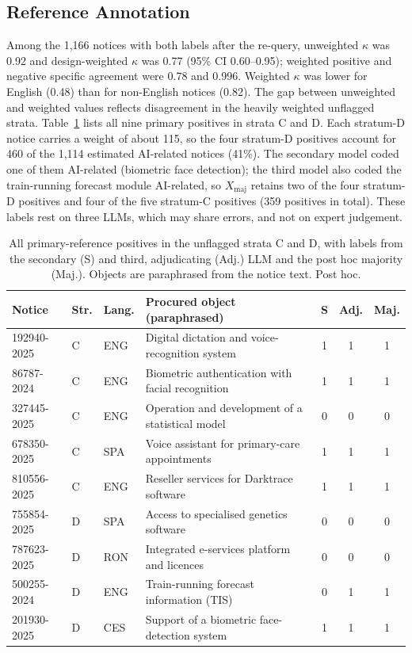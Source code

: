 \documentclass[runningheads]{llncs}
\begin{document}
\subsection{Reference Annotation}
Among the 1,166 notices with both labels after the re-query, unweighted $\kappa$ was 0.92 and design-weighted $\kappa$ was 0.77 (95\% CI 0.60--0.95); weighted positive and negative specific agreement were 0.78 and 0.996. Weighted $\kappa$ was lower for English (0.48) than for non-English notices (0.82). The gap between unweighted and weighted values reflects disagreement in the heavily weighted unflagged strata. Table~\ref{tab:cases} lists all nine primary positives in strata C and D. Each stratum-D notice carries a weight of about 115, so the four stratum-D positives account for 460 of the 1,114 estimated AI-related notices (41\%). The secondary model coded one of them AI-related (biometric face detection); the third model also coded the train-running forecast module AI-related, so $X_{\mathrm{maj}}$ retains two of the four stratum-D positives and four of the five stratum-C positives (359 positives in total). These labels rest on three LLMs, which may share errors, and not on expert judgement.

\begin{table}[t]
\caption{All primary-reference positives in the unflagged strata C and D, with labels from the secondary (S) and third, adjudicating (Adj.) LLM and the post hoc majority (Maj.). Objects are paraphrased from the notice text. Post hoc.}\label{tab:cases}
\centering
\begin{tabular}{llllccc}
\toprule
Notice & Str. & Lang. & Procured object (paraphrased) & S & Adj. & Maj. \\
\midrule
192940-2025 & C & ENG & Digital dictation and voice-recognition system & 1 & 1 & 1 \\
86787-2024  & C & ENG & Biometric authentication with facial recognition & 1 & 1 & 1 \\
327445-2025 & C & ENG & Operation and development of a statistical model & 0 & 0 & 0 \\
678350-2025 & C & SPA & Voice assistant for primary-care appointments & 1 & 1 & 1 \\
810556-2025 & C & ENG & Reseller services for Darktrace software & 1 & 1 & 1 \\
755854-2025 & D & SPA & Access to specialised genetics software & 0 & 0 & 0 \\
787623-2025 & D & RON & Integrated e-services platform and licences & 0 & 0 & 0 \\
500255-2024 & D & ENG & Train-running forecast information (TIS) & 0 & 1 & 1 \\
201930-2025 & D & CES & Support of a biometric face-detection system & 1 & 1 & 1 \\
\bottomrule
\end{tabular}
\end{table}
\end{document}
